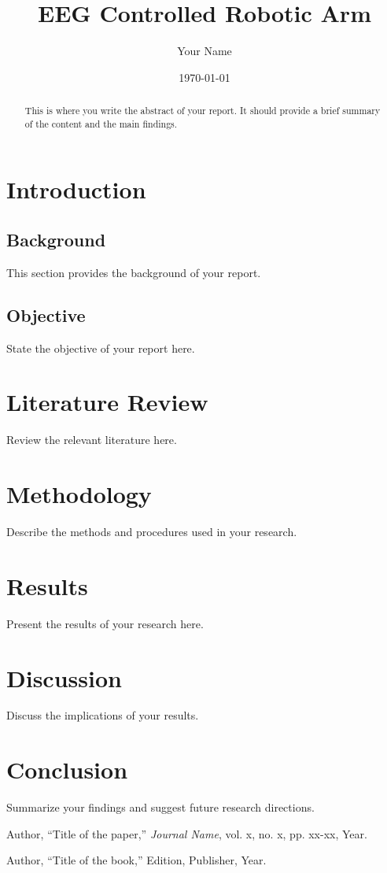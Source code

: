 \documentclass[12pt]{report}
\title{EEG Controlled Robotic Arm}
\author{Your Name}
\date{\today}
\begin{document}
\maketitle

\begin{abstract}
This is where you write the abstract of your report. It should provide a brief summary of the content and the main findings.
\end{abstract}

\tableofcontents
\listoffigures
\listoftables

\chapter{Introduction}
\section{Background}
This section provides the background of your report.

\section{Objective}
State the objective of your report here.

\chapter{Literature Review}
Review the relevant literature here.

\chapter{Methodology}
Describe the methods and procedures used in your research.

\chapter{Results}
Present the results of your research here.

\chapter{Discussion}
Discuss the implications of your results.

\chapter{Conclusion}
Summarize your findings and suggest future research directions.

\begin{thebibliography}{99}
Author, ``Title of the paper,'' \textit{Journal Name}, vol. x, no. x, pp. xx-xx, Year.

Author, ``Title of the book,'' Edition, Publisher, Year.
\end{thebibliography}
\end{document}
